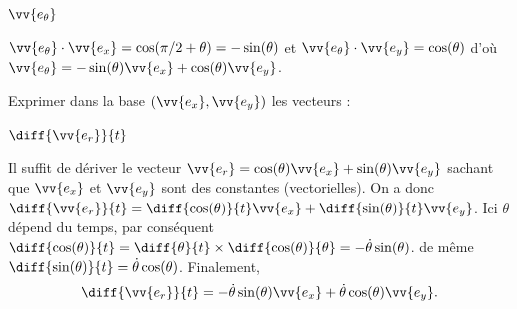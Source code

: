 \begin{enonce}
	$\vv{e_\theta}$
\end{enonce}


\begin{corrige}
 $\vv{e_\theta}\cdot\vv{e_x}=\cos(\pi/2+\theta)=-\sin(\theta)$ et  $\vv{e_\theta}\cdot\vv{e_y}=\cos(\theta)$ d'où $\vv{e_\theta}=- \sin(\theta) \vv{e_x} + \cos (\theta) \vv{e_y}$.
\end{corrige}

\finEntrainement




\titreEntrainementFacultatif	{}
\hauteurLargeurCadreReponse		{7mm}{4.5cm}
\initialisationEntrainement


Exprimer dans la base $(\vv{e_x}, \vv{e_y})$ les vecteurs : 

\debutEntrainement


\begin{enonce}
	$\diff{\vv{e_r}}{t}$
\end{enonce}


\begin{corrige}
 Il suffit de dériver le vecteur $\vv{e_r}=\cos(\theta) \vv{e_x} + \sin (\theta) \vv{e_y}$ sachant que $\vv{e_x}$ et $\vv{e_y}$ sont des constantes (vectorielles). On a donc $\diff{\vv{e_r}}{t}=\diff{\cos(\theta)}{t} \vv{e_x} + \diff{\sin (\theta)}{t} \vv{e_y}$. Ici $\theta$ dépend du temps, par conséquent $\diff{\cos(\theta)}{t}=\diff{\theta}{t}\times \diff{\cos(\theta)}{\theta}=-\dot{\theta}\sin(\theta)$. de même $\diff{\sin(\theta)}{t}=\dot{\theta}\cos(\theta)$. Finalement, 
 \[
 \diff{\vv{e_r}}{t}=-\dot{\theta}\sin(\theta) \vv{e_x} + \dot{\theta}\cos (\theta) \vv{e_y}.
 \]
\end{corrige}


